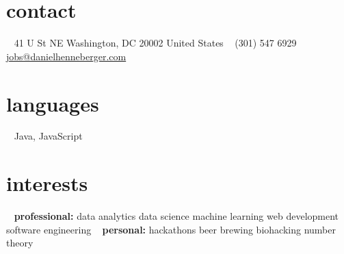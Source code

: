 \documentclass[]{friggeri-cv} %
\begin{document}


\begin{aside} %
\section{contact}
~
41 U St NE
Washington, DC 20002
United States
~
(301) 547 6929
~
{\fontsize{8pt}{10pt}\selectfont\href{mailto:jobs@danielhenneberger.com}{jobs@danielhenneberger.com}}
\section{languages}
~
Java, JavaScript
\section{interests}
~
\textbf{professional:}
data analytics
data science
machine learning
web development
software engineering
~
\textbf{personal:}
hackathons
beer brewing
biohacking
number theory
\end{aside}

\end{document}
